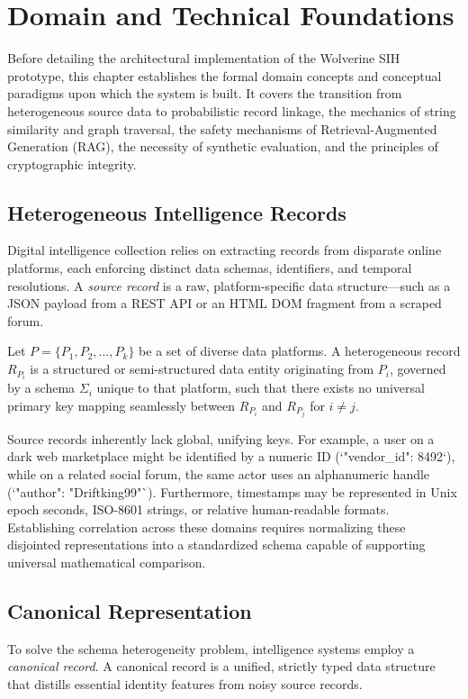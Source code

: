 \chapter{Domain and Technical Foundations}
\label{ch:foundations}

Before detailing the architectural implementation of the Wolverine SIH prototype, this chapter establishes the formal domain concepts and conceptual paradigms upon which the system is built. It covers the transition from heterogeneous source data to probabilistic record linkage, the mechanics of string similarity and graph traversal, the safety mechanisms of Retrieval-Augmented Generation (RAG), the necessity of synthetic evaluation, and the principles of cryptographic integrity.

\section{Heterogeneous Intelligence Records}
\label{sec:foundations-heterogeneous}
Digital intelligence collection relies on extracting records from disparate online platforms, each enforcing distinct data schemas, identifiers, and temporal resolutions. A \textit{source record} is a raw, platform-specific data structure—such as a JSON payload from a REST API or an HTML DOM fragment from a scraped forum. 

\begin{definition}
\label{def:heterogeneous-records}
Let $P = \{P_1, P_2, \ldots, P_k\}$ be a set of diverse data platforms. A heterogeneous record $R_{P_i}$ is a structured or semi-structured data entity originating from $P_i$, governed by a schema $\Sigma_i$ unique to that platform, such that there exists no universal primary key mapping seamlessly between $R_{P_i}$ and $R_{P_j}$ for $i \neq j$.
\end{definition}

Source records inherently lack global, unifying keys. For example, a user on a dark web marketplace might be identified by a numeric ID (`"vendor\_id": 8492`), while on a related social forum, the same actor uses an alphanumeric handle (`"author": "Driftking99"`). Furthermore, timestamps may be represented in Unix epoch seconds, ISO-8601 strings, or relative human-readable formats. Establishing correlation across these domains requires normalizing these disjointed representations into a standardized schema capable of supporting universal mathematical comparison.

\section{Canonical Representation}
\label{sec:foundations-canonical}
To solve the schema heterogeneity problem, intelligence systems employ a \textit{canonical record}. A canonical record is a unified, strictly typed data structure that distills essential identity features from noisy source records. 

